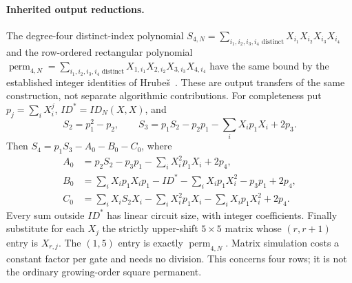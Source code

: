 \paragraph{Inherited output reductions.}
The degree-four distinct-index polynomial
$S_{4,N}=\sum_{i_1,i_2,i_3,i_4\text{ distinct}}X_{i_1}X_{i_2}X_{i_3}X_{i_4}$
and the row-ordered rectangular polynomial
$\operatorname{perm}_{4,N}=\sum_{i_1,i_2,i_3,i_4\text{ distinct}}
 X_{1,i_1}X_{2,i_2}X_{3,i_3}X_{4,i_4}$
have the same bound by the established integer identities of
Hrube\v{s}~\cite[Proposition~26]{hrubes2026}. These are output transfers
of the same construction, not separate algorithmic contributions.
For completeness put $p_j=\sum_i X_i^j$, $ID^*=ID_N(X,X)$, and
\[
 S_2=p_1^2-p_2,\qquad
 S_3=p_1S_2-p_2p_1-\sum_i X_i p_1 X_i+2p_3.
\]
Then $S_4=p_1S_3-A_0-B_0-C_0$, where
\begin{align*}
 A_0&=p_2S_2-p_3p_1-\sum_iX_i^2p_1X_i+2p_4,\\
 B_0&=\sum_i X_i p_1X_i p_1-ID^*
       -\sum_iX_i p_1X_i^2-p_3p_1+2p_4,\\
 C_0&=\sum_iX_iS_2X_i-\sum_iX_i^2p_1X_i
       -\sum_iX_i p_1X_i^2+2p_4.
\end{align*}
Every sum outside $ID^*$ has linear circuit size, with integer
coefficients. Finally substitute for each $X_j$ the strictly
upper-shift $5\times5$ matrix whose $(r,r+1)$ entry is $X_{r,j}$.
The $(1,5)$ entry is exactly $\operatorname{perm}_{4,N}$.
Matrix simulation costs a constant factor per gate and needs no
division. This concerns four rows; it is not the ordinary growing-order
square permanent.
